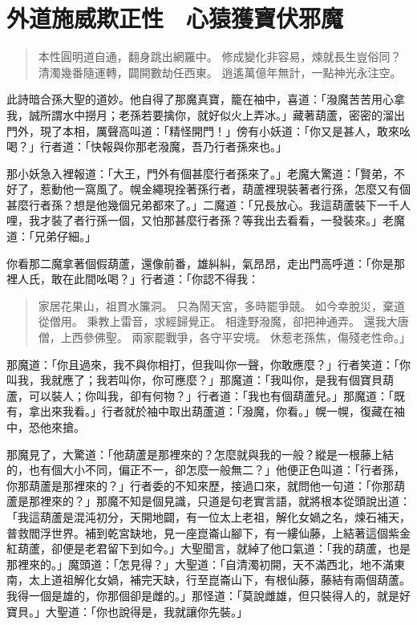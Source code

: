 
\chapter{外道施威欺正性　心猿獲寶伏邪魔}

\begin{quote}
本性圓明道自通，翻身跳出網羅中。
修成變化非容易，煉就長生豈俗同？
清濁幾番隨運轉，闢開數劫任西東。
逍遙萬億年無計，一點神光永注空。
\end{quote}

此詩暗合孫大聖的道妙。他自得了那魔真寶，籠在袖中，喜道：「潑魔苦苦用心拿我，誠所謂水中撈月；老孫若要擒你，就好似火上弄冰。」藏著葫蘆，密密的溜出門外，現了本相，厲聲高叫道：「精怪開門！」傍有小妖道：「你又是甚人，敢來吆喝？」行者道：「快報與你那老潑魔，吾乃行者孫來也。」

那小妖急入裡報道：「大王，門外有個甚麼行者孫來了。」老魔大驚道：「賢弟，不好了，惹動他一窩風了。幌金繩現拴著孫行者，葫蘆裡現裝著者行孫，怎麼又有個甚麼行者孫？想是他幾個兄弟都來了。」二魔道：「兄長放心。我這葫蘆裝下一千人哩，我才裝了者行孫一個，又怕那甚麼行者孫？等我出去看看，一發裝來。」老魔道：「兄弟仔細。」

你看那二魔拿著個假葫蘆，還像前番，雄糾糾，氣昂昂，走出門高呼道：「你是那裡人氏，敢在此間吆喝？」行者道：「你認不得我：
\begin{quote}
家居花果山，祖貫水簾洞。
只為鬧天宮，多時罷爭競。
如今幸脫災，棄道從僧用。
秉教上雷音，求經歸覺正。
相逢野潑魔，卻把神通弄。
還我大唐僧，上西參佛聖。
兩家罷戰爭，各守平安境。
休惹老孫焦，傷殘老性命。」
\end{quote}

那魔道：「你且過來，我不與你相打，但我叫你一聲，你敢應麼？」行者笑道：「你叫我，我就應了；我若叫你，你可應麼？」那魔道：「我叫你，是我有個寶貝葫蘆，可以裝人；你叫我，卻有何物？」行者道：「我也有個葫蘆兒。」那魔道：「既有，拿出來我看。」行者就於袖中取出葫蘆道：「潑魔，你看。」幌一幌，復藏在袖中，恐他來搶。

那魔見了，大驚道：「他葫蘆是那裡來的？怎麼就與我的一般？縱是一根藤上結的，也有個大小不同，偏正不一，卻怎麼一般無二？」他便正色叫道：「行者孫，你那葫蘆是那裡來的？」行者委的不知來歷，接過口來，就問他一句道：「你那葫蘆是那裡來的？」那魔不知是個見識，只道是句老實言語，就將根本從頭說出道：「我這葫蘆是混沌初分，天開地闢，有一位太上老祖，解化女媧之名，煉石補天，普救閻浮世界。補到乾宮缺地，見一座崑崙山腳下，有一縷仙藤，上結著這個紫金紅葫蘆，卻便是老君留下到如今。」大聖聞言，就綽了他口氣道：「我的葫蘆，也是那裡來的。」魔頭道：「怎見得？」大聖道：「自清濁初開，天不滿西北，地不滿東南，太上道祖解化女媧，補完天缺，行至崑崙山下，有根仙藤，藤結有兩個葫蘆。我得一個是雄的，你那個卻是雌的。」那怪道：「莫說雌雄，但只裝得人的，就是好寶貝。」大聖道：「你也說得是，我就讓你先裝。」

